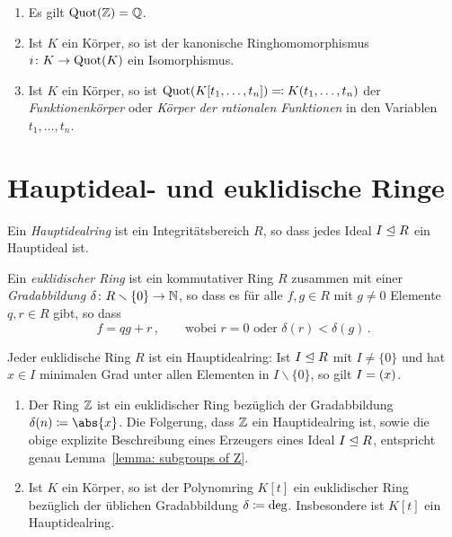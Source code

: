 \begin{example}
  \begin{enumerate}
    \item
      Es gilt $\operatorname{Quot}(\mathbb{Z}) = \mathbb{Q}$.
    \item
      Ist $K$ ein Körper, so ist der kanonische Ringhomomorphismus $i \colon K \to \operatorname{Quot}(K)$ ein Isomorphismus.
    \item
      Ist $K$ ein Körper, so ist $\operatorname{Quot}(K[t_1, \dotsc, t_n]) \eqqcolon K(t_1, \dotsc, t_n)$ der \emph{Funktionenkörper} oder \emph{Körper der rationalen Funktionen} in den Variablen $t_1, \dotsc, t_n$.
  \end{enumerate}
\end{example}





\section{Hauptideal- und euklidische Ringe}

\begin{definition}
  Ein \emph{Hauptidealring} ist ein Integritätsbereich $R$, so dass jedes Ideal $I \mathrel{\trianglelefteq} R$ ein Hauptideal ist.
\end{definition}

\begin{definition}
  Ein \emph{euklidischer Ring} ist ein kommutativer Ring $R$ zusammen mit einer \emph{Gradabbildung} $\delta \colon R \smallsetminus \{0\} \to \mathbb{N}$, so dass es für alle $f, g \in R$ mit $g \neq 0$ Elemente $q, r \in R$ gibt, so dass
  \[
    f = qg + r \,,
    \qquad
    \text{wobei $r = 0$ oder $\delta(r) < \delta(g)$} \,.
  \]
\end{definition}

\begin{lemma}
  Jeder euklidische Ring $R$ ist ein Hauptidealring:
  Ist $I \mathrel{\trianglelefteq} R$ mit $I \neq \{0\}$ und hat $x \in I$ minimalen Grad unter allen Elementen in $I \smallsetminus \{0\}$, so gilt $I = (x)$.
\end{lemma}

\begin{example}
  \begin{enumerate}
    \item
      Der Ring $\mathbb{Z}$ ist ein euklidischer Ring bezüglich der Gradabbildung $\delta(n) \defined \abs{x}$.
      Die Folgerung, dass $\mathbb{Z}$ ein Hauptidealring ist, sowie die obige explizite Beschreibung eines Erzeugers eines Ideal $I \mathrel{\trianglelefteq} R$, entspricht genau Lemma~\ref{lemma: subgroups of Z}.
    \item
      Ist $K$ ein Körper, so ist der Polynomring $K[t]$ ein euklidischer Ring bezüglich der üblichen Gradabbildung $\delta \coloneqq \deg$.
      Insbesondere ist $K[t]$ ein Hauptidealring.
  \end{enumerate}
\end{example}

